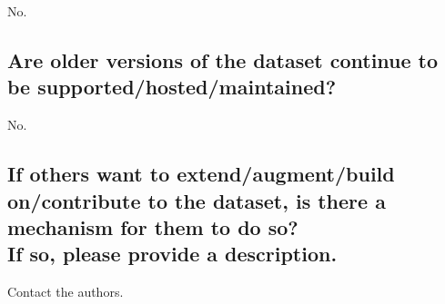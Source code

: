\documentclass[letterpaper, 10 pt, conference]{ieeeconf}  %
\newcommand{\subtitle}[1]{{\\ \small \normalfont \color{purple} #1}}
\begin{document}
No.

\subsection{Are older versions of the dataset continue to be supported/hosted/maintained?}

No.

\subsection{If others want to extend/augment/build on/contribute to the dataset, is there a mechanism for them to do so? \subtitle{If so, please provide a description.}}

Contact the authors.

\medskip
 
  

\end{document}
